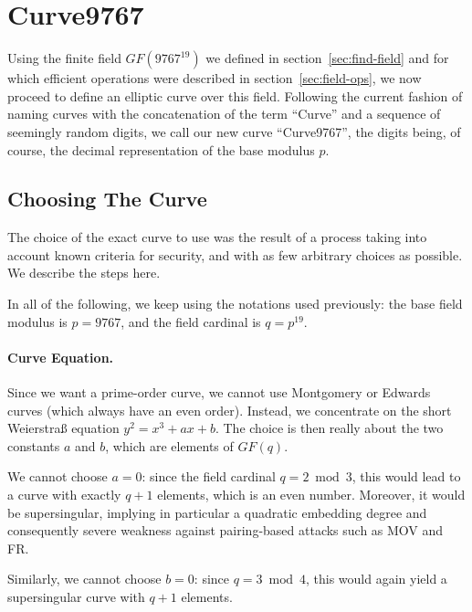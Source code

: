 \documentclass{llncs}
\newcommand{\GF}{GF}
\begin{document}
\section{Curve9767}\label{sec:curve9767}

Using the finite field $\GF(9767^{19})$ we defined in
section~\ref{sec:find-field} and for which efficient operations were
described in section~\ref{sec:field-ops}, we now proceed to define an
elliptic curve over this field. Following the current fashion of naming
curves with the concatenation of the term ``Curve'' and a sequence of
seemingly random digits, we call our new curve ``Curve9767'', the digits
being, of course, the decimal representation of the base modulus $p$.

\subsection{Choosing The Curve}

The choice of the exact curve to use was the result of a process taking
into account known criteria for security, and with as few arbitrary
choices as possible. We describe the steps here.

In all of the following, we keep using the notations used previously:
the base field modulus is $p = 9767$, and the field cardinal is $q =
p^{19}$.

\paragraph{Curve Equation.}

Since we want a prime-order curve, we cannot use Montgomery or Edwards
curves (which always have an even order). Instead, we concentrate on
the short Weierstraß equation $y^2 = x^3 + ax + b$. The choice is
then really about the two constants $a$ and $b$, which are elements of
$\GF(q)$.

We cannot choose $a = 0$: since the field cardinal $q = 2 \bmod 3$, this
would lead to a curve with exactly $q+1$ elements, which is an even
number. Moreover, it would be supersingular, implying in particular a
quadratic embedding degree and consequently severe weakness against
pairing-based attacks such as MOV\cite{MenOkaVan1993} and
FR\cite{FreRuc1994,FreMulRuc1999}.

Similarly, we cannot choose $b = 0$: since $q = 3 \bmod 4$, this would
again yield a supersingular curve with $q+1$ elements.
\end{document}
